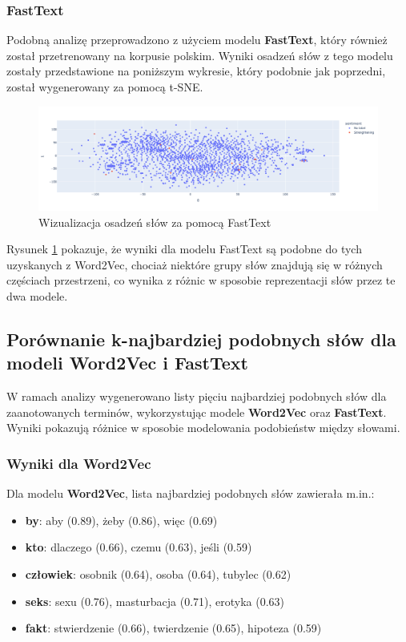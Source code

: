 \documentclass[12pt]{article}
\begin{document}
\subsubsection{FastText}
Podobną analizę przeprowadzono z użyciem modelu \textbf{FastText}, który również został przetrenowany na korpusie polskim. Wyniki osadzeń słów z tego modelu zostały przedstawione na poniższym wykresie, który podobnie jak poprzedni, został wygenerowany za pomocą t-SNE.

\begin{figure}[H]
    \centering
    \includegraphics[width=\textwidth]{../../plots/ft-word.png}
    \caption{Wizualizacja osadzeń słów za pomocą FastText}
    \label{fig:ft_word}
\end{figure}

Rysunek \ref{fig:ft_word} pokazuje, że wyniki dla modelu FastText są podobne do tych uzyskanych z Word2Vec, chociaż niektóre grupy słów znajdują się w różnych częściach przestrzeni, co wynika z różnic w sposobie reprezentacji słów przez te dwa modele.

\subsection{Porównanie k-najbardziej podobnych słów dla modeli Word2Vec i FastText}

W ramach analizy wygenerowano listy pięciu najbardziej podobnych słów dla zaanotowanych terminów, wykorzystując modele \textbf{Word2Vec} oraz \textbf{FastText}. Wyniki pokazują różnice w sposobie modelowania podobieństw między słowami.

\subsubsection{Wyniki dla Word2Vec}
Dla modelu \textbf{Word2Vec}, lista najbardziej podobnych słów zawierała m.in.:
\begin{itemize}
    \item \textbf{by}: aby (0.89), żeby (0.86), więc (0.69)
    \item \textbf{kto}: dlaczego (0.66), czemu (0.63), jeśli (0.59)
    \item \textbf{człowiek}: osobnik (0.64), osoba (0.64), tubylec (0.62)
    \item \textbf{seks}: sexu (0.76), masturbacja (0.71), erotyka (0.63)
    \item \textbf{fakt}: stwierdzenie (0.66), twierdzenie (0.65), hipoteza (0.59)
\end{itemize}
\end{document}
